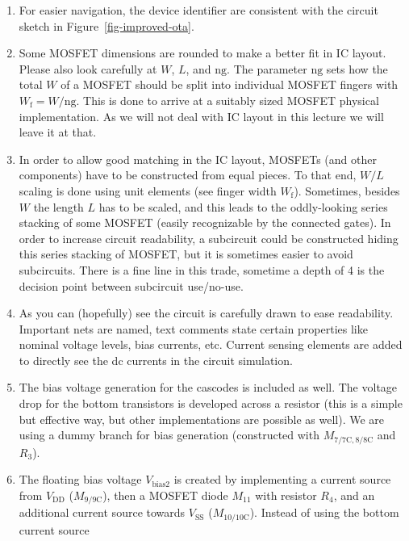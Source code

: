 \documentclass[
  a4paper,
  DIV=11,
  numbers=noendperiod]{scrartcl}
\providecommand{\tightlist}{%
  \setlength{\itemsep}{0pt}\setlength{\parskip}{0pt}}\usepackage{longtable,booktabs,array}
\begin{document}
\begin{enumerate}
\def\labelenumi{\arabic{enumi}.}
\tightlist
\item
  For easier navigation, the device identifier are consistent with the
  circuit sketch in Figure~\ref{fig-improved-ota}.
\item
  Some MOSFET dimensions are rounded to make a better fit in IC layout.
  Please also look carefully at \(W\), \(L\), and \(\mathrm{ng}\). The
  parameter \(\mathrm{ng}\) sets how the total \(W\) of a MOSFET should
  be split into individual MOSFET fingers with
  \(W_\mathrm{f} = W / \mathrm{ng}\). This is done to arrive at a
  suitably sized MOSFET physical implementation. As we will not deal
  with IC layout in this lecture we will leave it at that.
\item
  In order to allow good matching in the IC layout, MOSFETs (and other
  components) have to be constructed from equal pieces. To that end,
  \(W/L\) scaling is done using unit elements (see finger width
  \(W_\mathrm{f}\)). Sometimes, besides \(W\) the length \(L\) has to be
  scaled, and this leads to the oddly-looking series stacking of some
  MOSFET (easily recognizable by the connected gates). In order to
  increase circuit readability, a subcircuit could be constructed hiding
  this series stacking of MOSFET, but it is sometimes easier to avoid
  subcircuits. There is a fine line in this trade, sometime a depth of 4
  is the decision point between subcircuit use/no-use.
\item
  As you can (hopefully) see the circuit is carefully drawn to ease
  readability. Important nets are named, text comments state certain
  properties like nominal voltage levels, bias currents, etc. Current
  sensing elements are added to directly see the dc currents in the
  circuit simulation.
\item
  The bias voltage generation for the cascodes is included as well. The
  voltage drop for the bottom transistors is developed across a resistor
  (this is a simple but effective way, but other implementations are
  possible as well). We are using a dummy branch for bias generation
  (constructed with \(M_\mathrm{7/7C,8/8C}\) and \(R_3\)).
\item
  The floating bias voltage \(V_\mathrm{bias2}\) is created by
  implementing a current source from \(V_\mathrm{DD}\)
  (\(M_\mathrm{9/9C}\)), then a MOSFET diode \(M_{11}\) with resistor
  \(R_4\), and an additional current source towards \(V_\mathrm{SS}\)
  (\(M_\mathrm{10/10C}\)). Instead of using the bottom current source

\end{enumerate}
\end{document}

